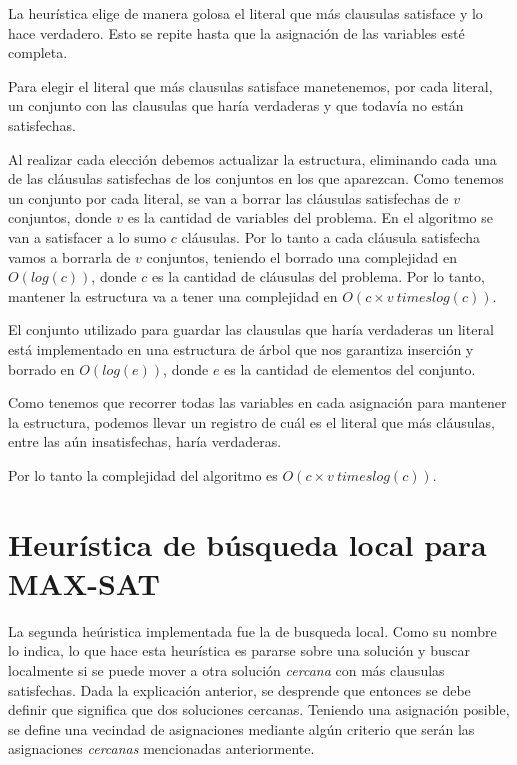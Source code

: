 \documentclass[a4paper,10pt]{article}
\begin{document}
La heurística elige de manera golosa el literal que más clausulas satisface y lo hace verdadero. Esto se repite hasta que la asignación de las variables esté completa.

Para elegir el literal que más clausulas satisface manetenemos, por cada literal, un conjunto con las clausulas que haría verdaderas y que todavía no están satisfechas.

Al realizar cada elección debemos actualizar la estructura, eliminando cada una de las cláusulas satisfechas de los conjuntos en los que aparezcan. Como tenemos un conjunto por cada literal, se van a borrar las cláusulas satisfechas de $v$ conjuntos, donde $v$ es la cantidad de variables del problema. En el algoritmo se van a satisfacer a lo sumo $c$ cláusulas. Por lo tanto a cada cláusula satisfecha vamos a borrarla de $v$ conjuntos, teniendo el borrado una complejidad en $O\left( log \left( c \right) \right)$, donde $c$ es la cantidad de cláusulas del problema. Por lo tanto, mantener la estructura va a tener una complejidad en $O\left( c \times v \ times log \left( c \right) \right)$.

El conjunto utilizado para guardar las clausulas que haría verdaderas un literal está implementado en una estructura de árbol que nos garantiza inserción y borrado en $O\left( log \left( e \right) \right)$, donde $e$ es la cantidad de elementos del conjunto.

Como tenemos que recorrer todas las variables en cada asignación para mantener la estructura, podemos llevar un registro de cuál es el literal que más cláusulas, entre las aún insatisfechas, haría verdaderas. 

Por lo tanto la complejidad del algoritmo es $O\left( c \times v \ times log \left( c \right) \right)$.



\section*{Heur\'istica de b\'usqueda local para MAX-SAT}

La segunda he\'uristica implementada fue la de busqueda local. Como su nombre lo indica, lo que hace esta heur\'istica es pararse sobre una soluci\'on y buscar localmente si se puede mover a otra soluci\'on \emph{cercana} con m\'as clausulas satisfechas. Dada la explicaci\'on anterior, se desprende que entonces se debe definir que significa que dos soluciones cercanas. Teniendo una asignaci\'on posible, se define una vecindad de asignaciones mediante alg\'un criterio que ser\'an las asignaciones \emph{cercanas} mencionadas anteriormente.
\end{document}
